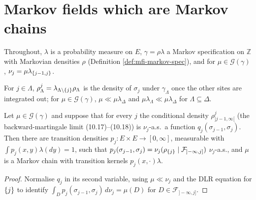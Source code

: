 \section{Markov fields which are Markov chains}

Throughout, $\lambda$ is a probability measure on $E$, $\gamma = \rho\lambda$ a Markov
specification on $\mathbb Z$ with Markovian densities $\rho$ (Definition \ref{def:mfi-markov-spec}),
and for $\mu \in \mathcal G(\gamma)$, $\nu_j = \mu\lambda_{\left\{ j-1,j \right\}}$.

\begin{definition}
    \label{def:mfc-marginal}
    \leanok

    For $j \in \Lambda$, $\rho^j_\Lambda = \lambda_{\Lambda \setminus\left\{ j \right\}}\rho_\Lambda$ is the
    density of $\sigma_j$ under $\gamma_\Lambda$ once the other sites are integrated out; for
    $\mu \in \mathcal G(\gamma)$, $\mu \ll \mu\lambda_\Delta$ and $\mu\lambda_\Lambda \ll \mu\lambda_\Delta$
    for $\Lambda \subseteq \Delta$.
\end{definition}

\begin{lemma}[Georgii (10.20)]
    \label{lem:mfc-10-20}
    \leanok

    Let $\mu \in \mathcal G(\gamma)$ and suppose that for every $j$ the conditional density
    $\rho^j_{]j-1,\infty[}$ (the backward-martingale limit (10.17)--(10.18)) is $\nu_j$-a.s.\ a
    function $q_j(\sigma_{j-1}, \sigma_j)$. Then there are transition densities
    $p_j \colon E \times E \to [0,\infty]$, measurable with $\int p_j(x,y)\lambda(dy) = 1$, such
    that $p_j(\sigma_{j-1},\sigma_j) = \nu_j(\rho_{\left\{ j \right\}} \mid \mathcal F_{]-\infty,j]})$
    $\nu_j$-a.s., and $\mu$ is a Markov chain with transition kernels $p_j(x,\cdot)\lambda$.
\end{lemma}
\begin{proof}
    \leanok
    Normalise $q_j$ in its second variable, using $\mu \ll \nu_j$ and the DLR equation for
    $\left\{ j \right\}$ to identify $\int_D p_j(\sigma_{j-1},\sigma_j)\,d\nu_j = \mu(D)$ for
    $D \in \mathcal F_{]-\infty,j]}$.
\end{proof}

